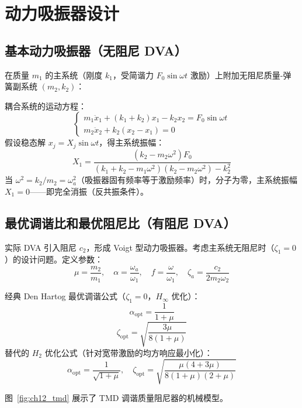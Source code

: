 \section{动力吸振器设计}
\subsection{基本动力吸振器（无阻尼 DVA）}
在质量 $m_1$ 的主系统（刚度 $k_1$，受简谐力 $F_0\sin\omega t$ 激励）上附加无阻尼质量-弹簧副系统 $(m_2, k_2)$：

\begin{myformula}
耦合系统的运动方程：
\[
\begin{cases}
m_1\ddot{x}_1 + (k_1 + k_2)x_1 - k_2 x_2 = F_0\sin\omega t \\
m_2\ddot{x}_2 + k_2(x_2 - x_1) = 0
\end{cases}
\]
假设稳态解 $x_j = X_j \sin\omega t$，得主系统振幅：
\[
X_1 = \frac{(k_2 - m_2\omega^{2})F_0}{(k_1 + k_2 - m_1\omega^{2})(k_2 - m_2\omega^{2}) - k_2^{2}}
\]
当 $\omega^{2} = k_2/m_2 = \omega_a^{2}$（吸振器固有频率等于激励频率）时，分子为零，主系统振幅 $X_1 = 0$——即完全消振（反共振条件）。
\end{myformula}

\subsection{最优调谐比和最优阻尼比（有阻尼 DVA）}
实际 DVA 引入阻尼 $c_2$，形成 Voigt 型动力吸振器。考虑主系统无阻尼时（$\zeta_1 = 0$）的设计问题。定义参数：
\[
\mu = \frac{m_2}{m_1}, \quad \alpha = \frac{\omega_a}{\omega_1}, \quad f = \frac{\omega}{\omega_1}, \quad \zeta_a = \frac{c_2}{2m_2\omega_2}
\]

\begin{myformula}
经典 Den Hartog 最优调谐公式（$\zeta_1 = 0$，$H_\infty$ 优化）：
\[
\alpha_{\text{opt}} = \frac{1}{1+\mu}
\]
\[
\zeta_{\text{opt}} = \sqrt{\frac{3\mu}{8(1+\mu)}}
\]
替代的 $H_2$ 优化公式（针对宽带激励的均方响应最小化）：
\[
\alpha_{\text{opt}} = \frac{1}{\sqrt{1+\mu}}, \quad \zeta_{\text{opt}} = \sqrt{\frac{\mu(4+3\mu)}{8(1+\mu)(2+\mu)}}
\]
\end{myformula}

图~\ref{fig:ch12_tmd} 展示了 TMD 调谐质量阻尼器的机械模型。

